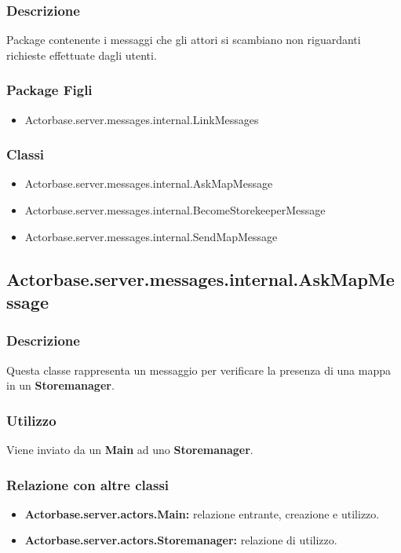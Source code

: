 \documentclass[a4paper]{article}
\begin{document}
			\subsubsection{Descrizione}
				Package contenente i messaggi che gli attori si scambiano non riguardanti richieste effettuate dagli utenti.
				
			\subsubsection{Package Figli}
				\begin{itemize}
					\item Actorbase.server.messages.internal.LinkMessages
				\end{itemize}
				
			\subsubsection{Classi}
				\begin{itemize}
					\item Actorbase.server.messages.internal.AskMapMessage
					\item Actorbase.server.messages.internal.BecomeStorekeeperMessage
					\item Actorbase.server.messages.internal.SendMapMessage
				\end{itemize}
			
		\subsection{Actorbase.server.messages.internal.AskMapMessage}
			\subsubsection{Descrizione}
				Questa classe rappresenta un messaggio per verificare la presenza di una mappa in un \textbf{Storemanager}.
				
			\subsubsection{Utilizzo}
				Viene inviato da un \textbf{Main} ad uno \textbf{Storemanager}.
				
			\subsubsection{Relazione con altre classi}
				\begin{itemize}
					\item \textbf{Actorbase.server.actors.Main:} relazione entrante, creazione e utilizzo.
					\item \textbf{Actorbase.server.actors.Storemanager:} relazione di utilizzo.
				\end{itemize}
				
\end{document}
